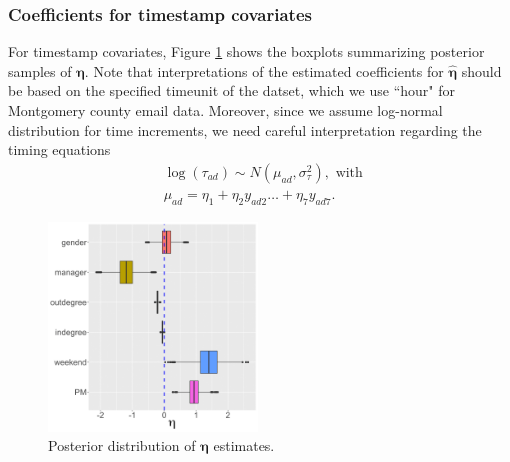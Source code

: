 \documentclass[ba]{imsart}
\numberwithin{equation}{section}
\theoremstyle{plain}
\begin{document}
		\subsubsection{Coefficients for timestamp covariates}
	For timestamp covariates, Figure \ref{figure:etaresults} shows the boxplots summarizing posterior samples of $\boldsymbol{\eta}$. Note that interpretations of the estimated coefficients for $\hat{\boldsymbol{\eta}}$ should be based on the specified timeunit of the datset, which we use ``hour" for Montgomery county email data. Moreover, since we assume log-normal distribution for time increments, we need careful interpretation regarding the timing equations
	\begin{equation*}
	\begin{aligned}
	&\log(\tau_{ad}) \sim N(\mu_{ad}, \sigma_\tau^2), \mbox{ with }\\
	&\mu_{ad} = \eta_{1}+\eta_{2} y_{ad2}\ldots+\eta_{7}y_{ad7}.
	\end{aligned}
	\end{equation*}
				\begin{figure}[!t]
					\centering
					\includegraphics[width=0.495\textwidth]{img/etaplotnew-1.png}	
					\caption {Posterior distribution of $\boldsymbol{\eta}$ estimates.}
					\label{figure:etaresults}
				\end{figure}	
\end{document}
